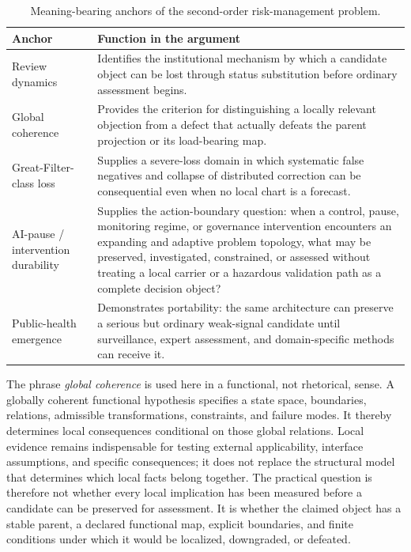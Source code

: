 \documentclass[11pt]{article}
\begin{document}
\begin{table}[htbp]
\centering
\caption{Meaning-bearing anchors of the second-order risk-management problem.}
\label{tab:anchors}
\begin{tabularx}{\textwidth}{>{\raggedright\arraybackslash}p{}X}
\toprule
Anchor & Function in the argument \\
\midrule
Review dynamics & Identifies the institutional mechanism by which a candidate object can be lost through status substitution before ordinary assessment begins. \\
Global coherence & Provides the criterion for distinguishing a locally relevant objection from a defect that actually defeats the parent projection or its load-bearing map. \\
Great-Filter-class loss & Supplies a severe-loss domain in which systematic false negatives and collapse of distributed correction can be consequential even when no local chart is a forecast. \\
AI-pause / intervention durability & Supplies the action-boundary question: when a control, pause, monitoring regime, or governance intervention encounters an expanding and adaptive problem topology, what may be preserved, investigated, constrained, or assessed without treating a local carrier or a hazardous validation path as a complete decision object? \\
Public-health emergence & Demonstrates portability: the same architecture can preserve a serious but ordinary weak-signal candidate until surveillance, expert assessment, and domain-specific methods can receive it. \\
\bottomrule
\end{tabularx}
\end{table}

The phrase \emph{global coherence} is used here in a functional, not rhetorical, sense. A globally coherent functional hypothesis specifies a state space, boundaries, relations, admissible transformations, constraints, and failure modes. It thereby determines local consequences conditional on those global relations. Local evidence remains indispensable for testing external applicability, interface assumptions, and specific consequences; it does not replace the structural model that determines which local facts belong together. The practical question is therefore not whether every local implication has been measured before a candidate can be preserved for assessment. It is whether the claimed object has a stable parent, a declared functional map, explicit boundaries, and finite conditions under which it would be localized, downgraded, or defeated.
\end{document}
